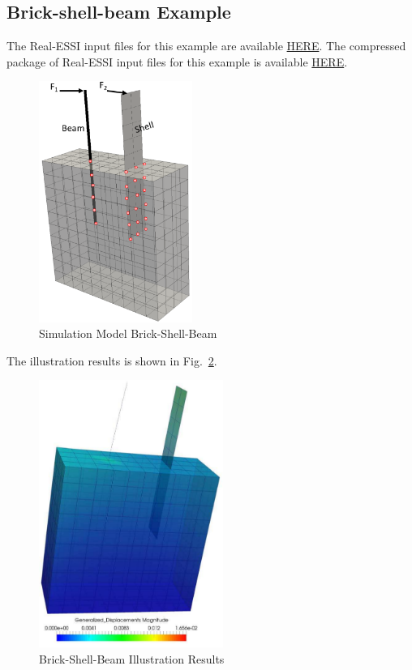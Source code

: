 \clearpage
\newpage
\subsection{Brick-shell-beam Example}

The Real-ESSI input files for this example are available 
\href{http://cml01.engr.ucdavis.edu/shortCourse/Day1/Preprocess_examples_with_Gmsh/brick-shell-beam}{HERE}. 
The compressed package of Real-ESSI input files for this example is available 
\href{http://cml01.engr.ucdavis.edu/shortCourse/Day1/Preprocess_examples_with_Gmsh/brick-shell-beam/brick-shell-beam.tgz}{HERE}. 



\begin{figure}[H]
  \centering
  \includegraphics[width = 5cm]{./Figure-files/Day1/Preprocess_examples_with_Gmsh/example2/overview.png}
  \caption{Simulation Model Brick-Shell-Beam}
  \label{fig_gmsh_ex2}
\end{figure}


The illustration results is shown in Fig.~\ref{fig_day1_gmsh_ex_beam_shell_brick}.

\begin{figure}[H]
  \centering
  \includegraphics[width = 6cm]{./Figure-files/Day1/Preprocess_examples_with_Gmsh/example2/beam-shell-results-visual.png}
  \caption{Brick-Shell-Beam Illustration Results }
  \label{fig_day1_gmsh_ex_beam_shell_brick}
\end{figure}


